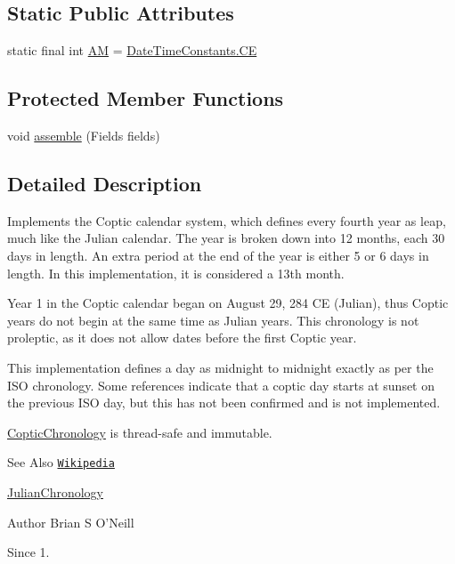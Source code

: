 \subsection*{Static Public Attributes}
\begin{DoxyCompactItemize}
\item 
static final int \hyperlink{classorg_1_1joda_1_1time_1_1chrono_1_1_coptic_chronology_a8de4d760b512dce36009b0507c2410fa}{A\-M} = \hyperlink{classorg_1_1joda_1_1time_1_1_date_time_constants_aacd9ad6e2964b143878d155f86db83bd}{Date\-Time\-Constants.\-C\-E}
\end{DoxyCompactItemize}
\subsection*{Protected Member Functions}
\begin{DoxyCompactItemize}
\item 
void \hyperlink{classorg_1_1joda_1_1time_1_1chrono_1_1_coptic_chronology_ac56c98d8ed75ad6b3d95e9602222c471}{assemble} (Fields fields)
\end{DoxyCompactItemize}


\subsection{Detailed Description}
Implements the Coptic calendar system, which defines every fourth year as leap, much like the Julian calendar. The year is broken down into 12 months, each 30 days in length. An extra period at the end of the year is either 5 or 6 days in length. In this implementation, it is considered a 13th month. 

Year 1 in the Coptic calendar began on August 29, 284 C\-E (Julian), thus Coptic years do not begin at the same time as Julian years. This chronology is not proleptic, as it does not allow dates before the first Coptic year. 

This implementation defines a day as midnight to midnight exactly as per the I\-S\-O chronology. Some references indicate that a coptic day starts at sunset on the previous I\-S\-O day, but this has not been confirmed and is not implemented. 

\hyperlink{classorg_1_1joda_1_1time_1_1chrono_1_1_coptic_chronology}{Coptic\-Chronology} is thread-\/safe and immutable.

\begin{DoxySeeAlso}{See Also}
\href{http://en.wikipedia.org/wiki/Coptic_calendar}{\tt Wikipedia} 

\hyperlink{classorg_1_1joda_1_1time_1_1chrono_1_1_julian_chronology}{Julian\-Chronology}
\end{DoxySeeAlso}
\begin{DoxyAuthor}{Author}
Brian S O'Neill 
\end{DoxyAuthor}
\begin{DoxySince}{Since}
1. 
\end{DoxySince}


